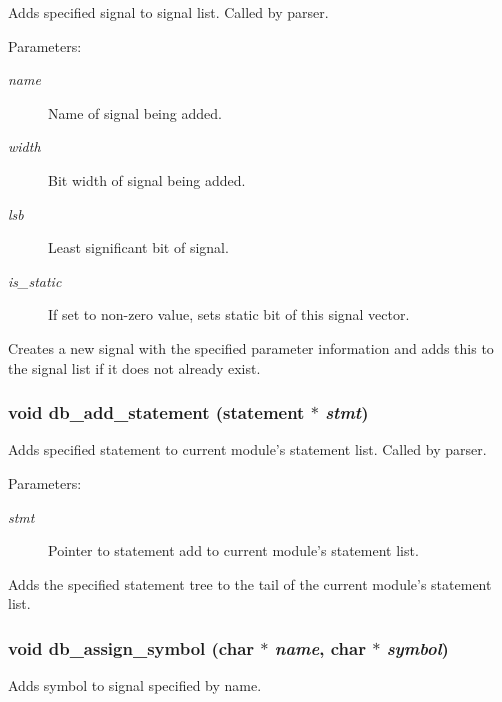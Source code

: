 Adds specified signal to signal list. Called by parser.

\begin{Desc}
\item[Parameters: ]\par
\begin{description}
\item[{\em 
name}]Name of signal being added. \item[{\em 
width}]Bit width of signal being added. \item[{\em 
lsb}]Least significant bit of signal. \item[{\em 
is\_\-static}]If set to non-zero value, sets static bit of this signal vector.\end{description}
\end{Desc}
Creates a new signal with the specified parameter information and adds this to the signal list if it does not already exist. 
\subsubsection{\setlength{\rightskip}{0pt plus 5cm}void db\_\-add\_\-statement ({\bf statement} $\ast$ {\em stmt})}\label{db_8h_a9}


Adds specified statement to current module's statement list. Called by parser.

\begin{Desc}
\item[Parameters: ]\par
\begin{description}
\item[{\em 
stmt}]Pointer to statement add to current module's statement list.\end{description}
\end{Desc}
Adds the specified statement tree to the tail of the current module's statement list. 
\subsubsection{\setlength{\rightskip}{0pt plus 5cm}void db\_\-assign\_\-symbol (char $\ast$ {\em name}, char $\ast$ {\em symbol})}\label{db_8h_a15}


Adds symbol to signal specified by name.

